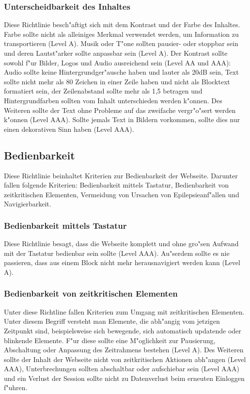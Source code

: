 \documentclass[a4paper,bibtotoc,oneside]{scrbook}
\begin{document}
\subsubsection{Unterscheidbarkeit des Inhaltes}
Diese Richtlinie besch"aftigt sich mit dem Kontrast und der Farbe des Inhaltes. Farbe sollte nicht als alleiniges Merkmal verwendet werden, um Information zu transportieren (Level A). Musik oder T"one sollten pausier- oder stoppbar sein und deren Lautst"arker sollte anpassbar sein (Level A). Der Kontrast sollte sowohl f"ur Bilder, Logos und Audio ausreichend sein (Level AA und AAA): Audio sollte keine Hintergrundger"ausche haben und lauter als 20dB sein, Text sollte nicht mehr als 80 Zeichen in einer Zeile haben und nicht als Blocktext formatiert sein, der Zeilenabstand sollte mehr als 1,5 betragen und Hintergrundfarben sollten vom Inhalt unterschieden werden k"onnen. Des Weiteren sollte der Text ohne Probleme auf das zweifache vergr"o"sert werden k"onnen (Level AAA). Sollte jemals Text in Bildern vorkommen, sollte dies nur einen dekorativen Sinn haben (Level AAA). \cite[Abschnitt 1.4]{wcag2}



\subsection{Bedienbarkeit}
Diese Richtlinie beinhaltet Kriterien zur Bedienbarkeit der Webseite. Darunter fallen folgende Kriterien: Bedienbarkeit mittels Tastatur, Bedienbarkeit von zeitkritischen Elementen, Vermeidung von Ursachen von Epilepsieanf"allen und Navigierbarkeit. \cite[Abschnitt 2]{wcag2}

\subsubsection{Bedienbarkeit mittels Tastatur}
Diese Richtlinie besagt, dass die Webseite komplett und ohne gro"sen Aufwand mit der Tastatur bedienbar sein sollte (Level AAA). Au"serdem sollte es nie passieren, dass aus einem Block nicht mehr herausnavigiert werden kann (Level A). \cite[Abschnitt 2.1]{wcag2}

\subsubsection{Bedienbarkeit von zeitkritischen Elementen}
Unter diese Richtline fallen Kriterien zum Umgang mit zeitkritischen Elementen. Unter diesem Begriff versteht man Elemente, die abh"angig vom jetzigen Zeitpunkt sind, beispielsweise sich bewegende, sich automatisch updatende oder blinkende Elemente. F"ur diese sollte eine M"oglichkeit zur Pausierung, Abschaltung oder Anpassung des Zeitrahmens bestehen (Level A). Des Weiteren sollte der Inhalt der Webseite nicht von zeitkritischen Aktionen abh"angen (Level AAA), Unterbrechungen sollten abschaltbar oder aufschiebar sein (Level AAA) und ein Verlust der Session sollte nicht zu Datenverlust beim erneuten Einloggen f"uhren. \cite[Abschnitt 2.2]{wcag2}
\end{document}
